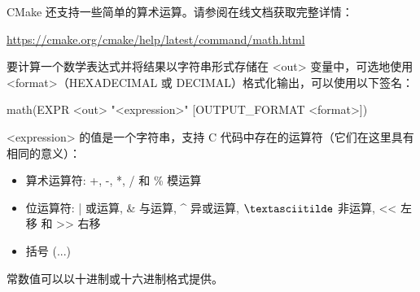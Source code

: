 CMake 还支持一些简单的算术运算。请参阅在线文档获取完整详情：

\url{https://cmake.org/cmake/help/latest/command/math.html}

要计算一个数学表达式并将结果以字符串形式存储在 <out> 变量中，可选地使用 <format>（HEXADECIMAL 或 DECIMAL）格式化输出，可以使用以下签名：

\begin{cmake}
math(EXPR <out> "<expression>" [OUTPUT_FORMAT <format>])
\end{cmake}

<expression> 的值是一个字符串，支持 C 代码中存在的运算符（它们在这里具有相同的意义）：

\begin{itemize}
\item
算术运算符: +, -, *, / 和 \% 模运算

\item
位运算符: | 或运算, \& 与运算, \^{} 异或运算, $\textasciitilde$ 非运算, <{}< 左移 和 >{}> 右移

\item
括号 (...)
\end{itemize}

常数值可以以十进制或十六进制格式提供。


